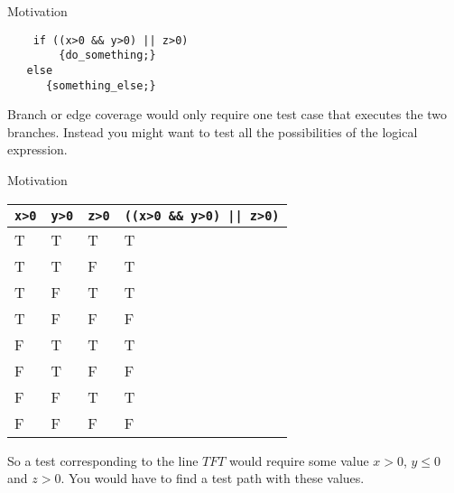 \documentclass{beamer}
\begin{document}
\begin{frame}[fragile]{Motivation}
  \begin{lstlisting}
    if ((x>0 && y>0) || z>0) 
        {do_something;} 
   else 
      {something_else;}
  \end{lstlisting}
Branch or edge coverage would only require one test case that executes
the two branches. Instead you might want to test all the possibilities
of the logical expression.


  
\end{frame}
\begin{frame}[fragile]{Motivation}
\begin{tabular}{|l|l|l|l|}
  \hline 
  {\tt x>0} & {\tt y>0} & {\tt z>0} & \verb+((x>0 && y>0) || z>0)+ \\ 
  \hline
  T & T & T & T \\
  T & T & F & T \\
  T & F & T & T \\
  T & F & F & F \\
  F & T & T & T \\
  F & T & F & F \\
  F & F & T & T \\
  F & F & F & F \\
  \hline 
\end{tabular}

So a test corresponding to the line $TFT$ would require some value
$x>0$, $y\leq 0$ and $z>0$. You would have to find a test path with
these values.
\end{frame}
\end{document}
